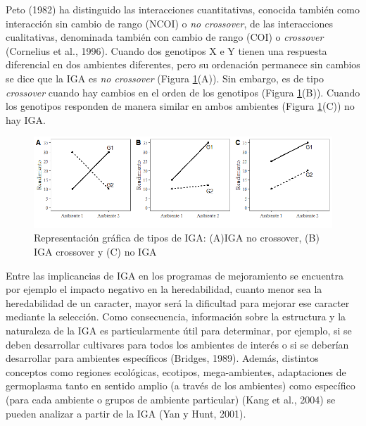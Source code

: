 Peto (1982) ha distinguido las interacciones cuantitativas, conocida también como interacción sin cambio de rango (NCOI) o \emph{no crossover}, de las interacciones cualitativas, denominada también con
cambio de rango (COI) o \emph{crossover} (Cornelius et al., 1996). Cuando dos genotipos X e Y tienen una respuesta diferencial en dos ambientes diferentes, pero su ordenación permanece sin cambios se dice que la IGA es \emph{no crossover} (Figura \ref{fig:fig11}(A)). Sin embargo, es de tipo \emph{crossover} cuando hay cambios en el orden de los genotipos (Figura  \ref{fig:fig11}(B)). Cuando los genotipos responden de manera similar en ambos ambientes (Figura \ref{fig:fig11}(C)) no hay IGA. 


\begin{figure}[h]
\begin{center}
\includegraphics[width=14cm]{./Graficos/interac}
\end{center}
\caption{Representación gráfica de tipos de IGA: (A)IGA no crossover, (B) IGA crossover y (C) no IGA}
\label{fig:fig11}
\end{figure}


Entre las implicancias de IGA en los programas de mejoramiento se encuentra por ejemplo el impacto negativo en la heredabilidad, cuanto menor sea la heredabilidad de un caracter, mayor será la dificultad para mejorar ese caracter mediante la selección. Como consecuencia, información sobre la estructura y la naturaleza de la IGA es particularmente útil para determinar, por ejemplo, si se deben desarrollar cultivares para todos los ambientes de interés o si se deberían desarrollar para ambientes específicos (Bridges, 1989). Además, distintos conceptos como regiones ecológicas, ecotipos, mega-ambientes, adaptaciones de germoplasma tanto en sentido amplio (a través de los ambientes) como específico (para cada ambiente o grupos de ambiente particular) (Kang et al., 2004) se pueden analizar a partir de la IGA (Yan y Hunt, 2001).


